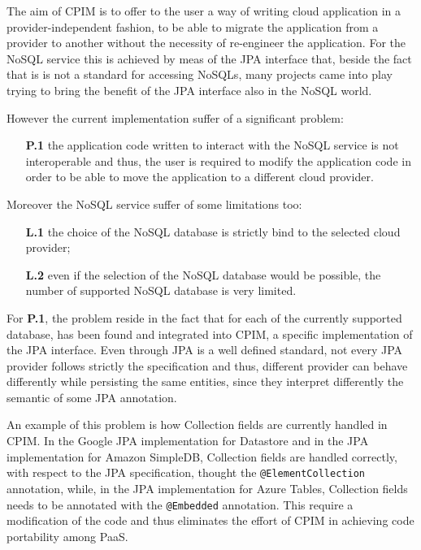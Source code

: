 \newparagraph The aim of CPIM is to offer to the user a way of writing cloud application in a provider-independent fashion, to be able to migrate the application from a provider to another without the necessity of re-engineer the application. For the NoSQL service this is achieved by meas of the JPA interface that, beside the fact that is is not a standard for accessing NoSQLs, many projects came into play trying to bring the benefit of the JPA interface also in the NoSQL world. 

\noindent However the current implementation suffer of a significant problem:
\begin{enumerate}
\item[\textbf{P.1}] the application code written to interact with the NoSQL service is not interoperable and thus, the user is required to modify the application code in order to be able to move the application to a different cloud provider.  
\end{enumerate}
\noindent Moreover the NoSQL service suffer of some limitations too:
\begin{enumerate}
\item[\textbf{L.1}] the choice of the NoSQL database is strictly bind to the selected cloud provider; 
\item[\textbf{L.2}] even if the selection of the NoSQL database would be possible, the number of supported NoSQL database is very limited.
\end{enumerate}

\noindent For \textbf{P.1}, the problem reside in the fact that for each of the currently supported database, has been found and integrated into CPIM, a specific implementation of the JPA interface. Even through JPA is a well defined standard, not every JPA provider follows strictly the specification and thus, different provider can behave differently while persisting the same entities, since they interpret differently the semantic of some JPA annotation.

\noindent An example of this problem is how Collection fields are currently handled in CPIM. In the Google JPA implementation for Datastore and in the JPA implementation for Amazon SimpleDB, Collection fields are handled correctly, with respect to the JPA specification, thought the \texttt{@ElementCollection} annotation, while, in the JPA implementation for Azure Tables, Collection fields needs to be annotated with the \texttt{@Embedded} annotation. This require a modification of the code and thus eliminates the effort of CPIM in achieving code portability among PaaS.

